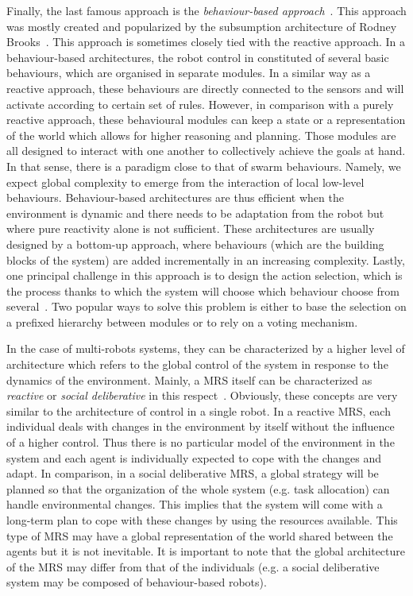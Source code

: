     Finally, the last famous approach is the \emph{behaviour-based approach}~\parencite{Arkin1998}. This approach was mostly created and popularized by the subsumption architecture of Rodney Brooks~\parencite{Brooks1986}. This approach is sometimes closely tied with the reactive approach. In a behaviour-based architectures, the robot control in constituted of several basic behaviours, which are organised in separate modules. In a similar way as a reactive approach, these behaviours are directly connected to the sensors and will activate according to certain set of rules. However, in comparison with a purely reactive approach, these behavioural modules can keep a state or a representation of the world which allows for higher reasoning and planning. Those modules are all designed to interact with one another to collectively achieve the goals at hand. In that sense, there is a paradigm close to that of swarm behaviours. Namely, we expect global complexity to emerge from the interaction of local low-level behaviours. Behaviour-based architectures are thus efficient when the environment is dynamic and there needs to be adaptation from the robot but where pure reactivity alone is not sufficient. These architectures are usually designed by a bottom-up approach, where behaviours (which are the building blocks of the system) are added incrementally in an increasing complexity. Lastly, one principal challenge in this approach is to design the action selection, which is the process thanks to which the system will choose which behaviour choose from several~\parencite{Pirjanian2000}. Two popular ways to solve this problem is either to base the selection on a prefixed hierarchy between modules or to rely on a voting mechanism.

    In the case of multi-robots systems, they can be characterized by a higher level of architecture which refers to the global control of the system in response to the dynamics of the environment. Mainly, a MRS itself can be characterized as \emph{reactive} or \emph{social deliberative} in this respect~\parencite{Iocchi2001, Carpin2001}. Obviously, these concepts are very similar to the architecture of control in a single robot. In a reactive MRS, each individual deals with changes in the environment by itself without the influence of a higher control. Thus there is no particular model of the environment in the system and each agent is individually expected to cope with the changes and adapt. In comparison, in a social deliberative MRS, a global strategy will be planned so that the organization of the whole system (e.g. task allocation) can handle environmental changes. This implies that the system will come with a long-term plan to cope with these changes by using the resources available. This type of MRS may have a global representation of the world shared between the agents but it is not inevitable. It is important to note that the global architecture of the MRS may differ from that of the individuals (e.g. a social deliberative system may be composed of behaviour-based robots).

